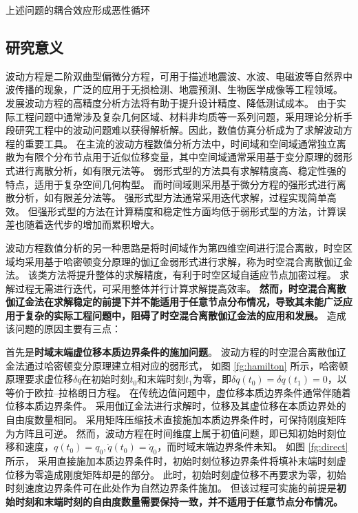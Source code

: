 
上述问题的耦合效应形成恶性循环

\subsection{研究意义}
波动方程是二阶双曲型偏微分方程\cite{bedford1994}，可用于描述地震波、水波、电磁波等自然界中波传播的现象，广泛的应用于无损检测、地震预测、生物医学成像等工程领域。
发展波动方程的高精度分析方法将有助于提升设计精度、降低测试成本。
由于实际工程问题中通常涉及复杂几何区域、材料非均质等一系列问题，采用理论分析手段研究工程中的波动问题难以获得解析解。因此，数值仿真分析成为了求解波动方程的重要工具。
在主流的波动方程数值分析方法中\cite{hughes2000}，时间域和空间域通常独立离散为有限个分布节点用于近似位移变量，其中空间域通常采用基于变分原理的弱形式进行离散分析，如有限元法等。
弱形式型的方法具有求解精度高、稳定性强的特点，适用于复杂空间几何构型。
而时间域则采用基于微分方程的强形式进行离散分析，如有限差分法等。
强形式型方法通常采用迭代求解，过程实现简单高效。
但强形式型的方法在计算精度和稳定性方面均低于弱形式型的方法，计算误差也随着迭代步的增加而累积增大。

波动方程数值分析的另一种思路是将时间域作为第四维空间进行混合离散，时空区域均采用基于哈密顿变分原理的伽辽金弱形式进行求解，称为时空混合离散伽辽金法。
该类方法将提升整体的求解精度，有利于时空区域自适应节点加密过程。
求解过程无需进行迭代，可采用整体并行计算求解提高效率。
\textbf{
然而，时空混合离散伽辽金法在求解稳定的前提下并不能适用于任意节点分布情况，导致其未能广泛应用于复杂的实际工程问题中，阻碍了时空混合离散伽辽金法的应用和发展。
}
造成该问题的原因主要有三点：

首先是\textbf{时域末端虚位移本质边界条件的施加问题}。
波动方程的时空混合离散伽辽金法通过哈密顿变分原理建立相对应的弱形式，
如图 \ref{fg:hamilton} 所示，哈密顿原理要求虚位移$\delta q$在初始时刻$t_0$和末端时刻$t_1$为零，即$\delta q(t_0)=\delta q(t_1)=0$，以等价于欧拉--拉格朗日方程\cite{arnold1978}。
在传统边值问题中，虚位移本质边界条件通常伴随着位移本质边界条件。
采用伽辽金法进行求解时，位移及其虚位移在本质边界处的自由度数量相同。
采用矩阵压缩技术直接施加本质边界条件时，可保持刚度矩阵为方阵且可逆。
然而，波动方程在时间维度上属于初值问题，即已知初始时刻位移和速度，$q(t_0)=q_0,\dot q(t_0) = \dot q_0$，而时域末端边界条件未知。
如图 \ref{fg:direct} 所示，
采用直接施加本质边界条件时，初始时刻位移边界条件将填补末端时刻虚位移为零造成刚度矩阵却是的部分。
此时，初始时刻虚位移不再要求为零，初始时刻速度边界条件可在此处作为自然边界条件施加。
但该过程可实施的前提是\textbf{初始时刻和末端时刻的自由度数量需要保持一致，并不适用于任意节点分布情况。}

